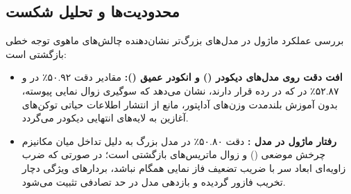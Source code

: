 \subsection{محدودیت‌ها و تحلیل شکست}
بررسی عملکرد ماژول در مدل‌های بزرگ‌تر نشان‌دهنده چالش‌های ماهوی توجه خطی بازگشتی است:
\begin{itemize}
    \item \textbf{افت دقت روی مدل‌های دیکودر () و انکودر عمیق ():} مقادیر دقت ۵۰.۹۲٪ در  و ۵۲.۸۷٪ در  که در رده  قرار دارند، نشان می‌دهد که سوگیری زوال نمایی پیوسته، بدون آموزش بلندمدت وزن‌های آداپتور، مانع از انتشار اطلاعات حیاتی توکن‌های آغازین به لایه‌های انتهایی دیکودر می‌گردد.
    \item \textbf{رفتار ماژول در مدل :} دقت ۵۰.۸۰٪ در مدل بزرگ  به دلیل تداخل میان مکانیزم چرخش موضعی () و زوال ماتریس‌های بازگشتی است؛ در صورتی که ضرب زاویه‌ای ابعاد سر با ضریب تضعیف فاز نمایی همگام نباشد، بردارهای ویژگی دچار تخریب فازور گردیده و بازدهی مدل در حد تصادفی تثبیت می‌شود.
\end{itemize}
